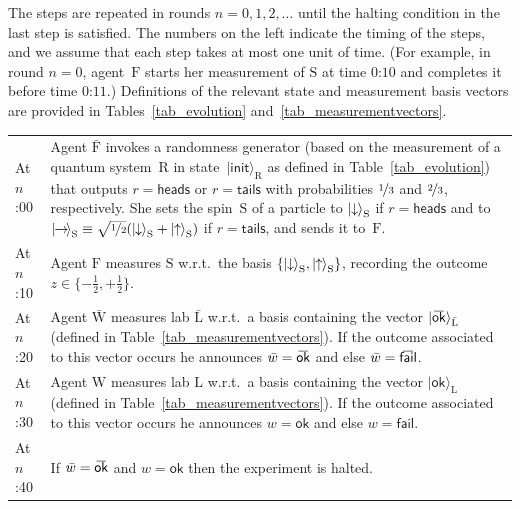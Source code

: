 \documentclass[12pt]{article}
\theoremstyle{mystyle}
\theoremstyle{definition}
\newcommand{\oline}[2]{{\mkern#2mu\overline{\protect\vphantom{t}\mkern-#2mu\smash{#1}\mkern-#2mu}\mkern#2mu}}
\newcommand*{\ket}[1]{{| #1 \rangle}}
\newcommand*{\Friendone}{\mathrm{\bar{F}}}
\newcommand*{\Friendtwo}{\mathrm{F}}
\newcommand*{\Labone}{\mathrm{\bar{L}}}
\newcommand*{\Labtwo}{\mathrm{L}}
\newcommand*{\Assistant}{\mathrm{\bar{W}}}
\newcommand*{\Wigner}{\mathrm{W}}
\newcommand*{\Spin}{\mathrm{S}}
\newcommand*{\Coin}{\mathrm{R}}
\newcommand*{\wb}{\bar{w}}
\newcommand*{\spinup}{\ket{{\hspace{-0.1ex}\uparrow\hspace{-0.1ex}}}}
\newcommand*{\spindown}{\ket{{\hspace{-0.1ex}\downarrow\hspace{-0.1ex}}}}
\newcommand*{\spinright}{\ket{{\hspace{-0.2ex}\rightarrow\hspace{-0.4ex}}}}
\newcommand*{\sminus}{{\textstyle - \frac{1}{2}}}
\newcommand*{\splus}{{\textstyle + \frac{1}{2}}}
\newcommand*{\ok}{\mathsf{ok}}
\newcommand*{\fail}{\mathsf{fail}}
\newcommand*{\okb}{\oline{\ok}{2.8}}
\newcommand*{\failb}{\oline{\fail}{5}}
\newcommand*{\head}{\mathsf{heads}}
\newcommand*{\tail}{\mathsf{tails}}
\begin{document}
{
\newcommand*{\lb}{\\[1.4ex]}

\begin{framed}


\vspace{1.1ex}

{\footnotesize

\noindent The steps are repeated in rounds $n = 0, 1, 2, \ldots $  until the halting condition in the last step is satisfied.  The numbers on the left indicate the timing of the steps, and we assume that each step takes at most one unit of time.  (For example, in round $n=0$, agent~$\Friendtwo$ starts her measurement of $\Spin$ at time $\text{0:10}$ and completes it before time $\text{0:11}$.) Definitions of the relevant state and measurement basis vectors are provided in Tables~\ref{tab_evolution} and~\ref{tab_measurementvectors}. 

\vspace{-0.6ex}

\begin{center}

\begin{tabular}{p{3.7em} p{}}
At $n$:00 & Agent $\Friendone$ invokes a randomness generator (based on the measurement of a quantum system~$\Coin$ in state~$\ket{\mathsf{init}}_{\Coin}$ as defined in Table~\ref{tab_evolution}) that outputs $r=\head$ or $r=\tail$ with probabilities $\nicefrac{1}{3}$ and $\nicefrac{2}{3}$, respectively.  She sets the spin~$\Spin$ of a particle to  $\spindown_{\Spin}$ if $r =\head$ and to $\spinright_\Spin \equiv \smash{\sqrt{\nicefrac{1}{2}}(\spindown_{\Spin} + \spinup_{\Spin})}$ if $r = \tail$, and  sends it to~$\Friendtwo$. 
\lb
At $n$:10 & Agent $\Friendtwo$ measures $\Spin$ w.r.t.\ the basis $\{\spindown_\Spin, \spinup_\Spin\}$, recording the outcome $z \in \{\sminus, \splus\}$.  
\lb
At $n$:20 &  Agent $\Assistant$ measures lab $\Labone$ w.r.t.\ a basis containing the vector  $\ket{\okb}_{\Labone}$ (defined in Table~\ref{tab_measurementvectors}). If the outcome associated to this vector occurs he announces $\wb=\okb$ and else $\wb=\failb$. 
\lb
 At $n$:30 &  Agent $\Wigner$ measures lab $\Labtwo$ w.r.t.\ a basis containing the vector $\ket{\ok}_{\Labtwo}$ (defined in Table~\ref{tab_measurementvectors}). If the outcome associated to this vector occurs he announces $w=\ok$  and else $w=\fail$. 
 \lb
At $n$:40 & If $\wb = \okb$ and $w = \ok$ then the experiment is halted. \\[-1ex]
\end{tabular}
\end{center}
}

\end{framed}
}
\end{document}
